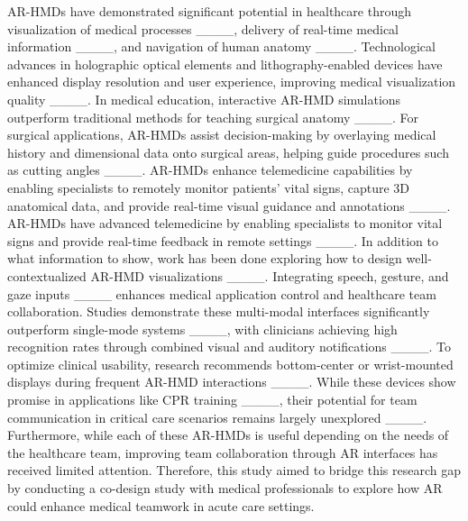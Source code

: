 AR-HMDs have demonstrated significant potential in healthcare through visualization of medical processes ____, delivery of real-time medical information ____, and navigation of human anatomy ____. Technological advances in holographic optical elements and lithography-enabled devices have enhanced display resolution and user experience, improving medical visualization quality ____. In medical education, interactive AR-HMD simulations outperform traditional methods for teaching surgical anatomy ____. For surgical applications, AR-HMDs assist decision-making by overlaying medical history and dimensional data onto surgical areas, helping guide procedures such as cutting angles ____. AR-HMDs enhance telemedicine capabilities by enabling specialists to remotely monitor patients' vital signs, capture 3D anatomical data, and provide real-time visual guidance and annotations ____. AR-HMDs have advanced telemedicine by enabling specialists to monitor vital signs and provide real-time feedback in remote settings ____. In addition to what information to show, work has been done exploring how to design well-contextualized AR-HMD visualizations ____. Integrating speech, gesture, and gaze inputs ____ enhances medical application control and healthcare team collaboration. Studies demonstrate these multi-modal interfaces significantly outperform single-mode systems ____, with clinicians achieving high recognition rates through combined visual and auditory notifications ____. To optimize clinical usability, research recommends bottom-center or wrist-mounted displays during frequent AR-HMD interactions ____. While these devices show promise in applications like CPR training ____, their potential for team communication in critical care scenarios remains largely unexplored ____. Furthermore, while each of these AR-HMDs is useful depending on the needs of the healthcare team, improving team collaboration through AR interfaces has received limited attention. Therefore, this study aimed to bridge this research gap by conducting a co-design study with medical professionals to explore how AR could enhance medical teamwork in acute care settings. 

